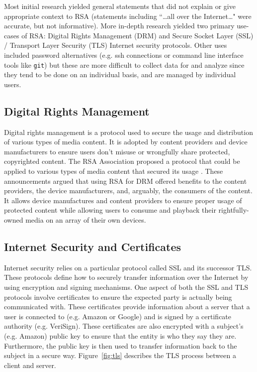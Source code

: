 \documentclass[smallextended]{svjour3}       %
\begin{document}
Most initial research yielded general statements that did not explain or give
appropriate context to RSA (statements including ``\dots all over the
Internet\dots" were accurate, but not informative). More in-depth research
yielded two primary use-cases of RSA: Digital Rights Management (DRM) and
Secure Socket Layer (SSL) / Transport Layer Security (TLS) Internet
security protocols. Other uses included password alternatives (e.g. ssh
connections or command line interface tools like \texttt{git}) but these are
more difficult to collect data for and analyze since they tend to be done on
an individual basis, and are managed by individual users.

\subsection{Digital Rights Management}
\label{subsec:drm}
Digital rights management is a protocol used to secure the usage and
distribution of various types of media content. It is adopted by content
providers and device manufacturers to ensure users don't misuse or wrongfully 
share protected, copyrighted content. The RSA Association proposed a protocol
that could be applied to various types of media content that secured its usage
\citep{rsa2004announces,rsa2004supports}. These announcements argued that using
RSA for DRM offered benefits to the content providers, the device
manufacturers, and, arguably, the consumers of the content. It allows device
manufactures and content providers to ensure proper usage of protected content
while allowing users to consume and playback their rightfully-owned media on an
array of their own devices.

\subsection{Internet Security and Certificates}
\label{subsec:netsec}
Internet security relies on a particular protocol called SSL and its successor
TLS. These protocols define how to securely transfer information over the
Internet by using encryption and signing mechanisms. One aspect of both the SSL
and TLS protocols involve certificates to ensure the expected party is
actually being communicated with. These certificates provide information
about a server that a user is connected to (e.g. Amazon or Google)
and is signed by a certificate authority (e.g. VeriSign). These certificates
are also encrypted with a subject's (e.g. Amazon) public key to ensure that
the entity is who they say they are. Furthermore, the public key is then used 
to transfer information back to the subject in a secure way.
Figure~\ref{fig:tls} describes the TLS process between a client and server. 
\end{document}
